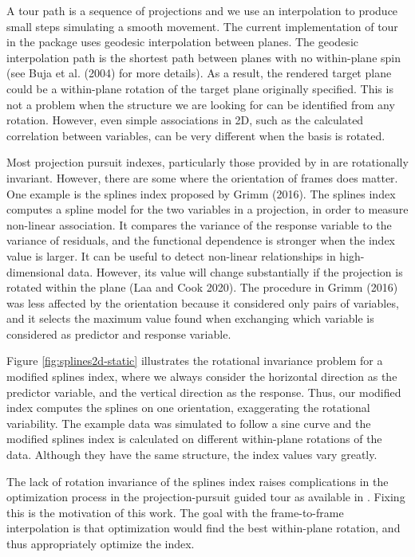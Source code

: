 A tour path is a sequence of projections and we use an interpolation to produce small steps simulating a smooth movement. The current implementation of tour in the  package uses geodesic interpolation between planes. The geodesic interpolation path is the shortest path between planes with no within-plane spin (see Buja et al. (2004) for more details). As a result, the rendered target plane could be a within-plane rotation of the target plane originally specified. This is not a problem when the structure we are looking for can be identified from any rotation. However, even simple associations in 2D, such as the calculated correlation between variables, can be very different when the basis is rotated.

Most projection pursuit indexes, particularly those provided by in  are rotationally invariant. However, there are some where the orientation of frames does matter. One example is the splines index proposed by Grimm (2016). The splines index computes a spline model for the two variables in a projection, in order to measure non-linear association. It compares the variance of the response variable to the variance of residuals, and the functional dependence is stronger when the index value is larger. It can be useful to detect non-linear relationships in high-dimensional data. However, its value will change substantially if the projection is rotated within the plane (Laa and Cook 2020). The procedure in Grimm (2016) was less affected by the orientation because it considered only pairs of variables, and it selects the maximum value found when exchanging which variable is considered as predictor and response variable.

Figure \ref{fig:splines2d-static} illustrates the rotational invariance problem for a modified splines index, where we always consider the horizontal direction as the predictor variable, and the vertical direction as the response. Thus, our modified index computes the splines on one orientation, exaggerating the rotational variability. The example data was simulated to follow a sine curve and the modified splines index is calculated on different within-plane rotations of the data. Although they have the same structure, the index values vary greatly.

The lack of rotation invariance of the splines index raises complications in the optimization process in the projection-pursuit guided tour as available in . Fixing this is the motivation of this work. The goal with the frame-to-frame interpolation is that optimization would find the best within-plane rotation, and thus appropriately optimize the index.

